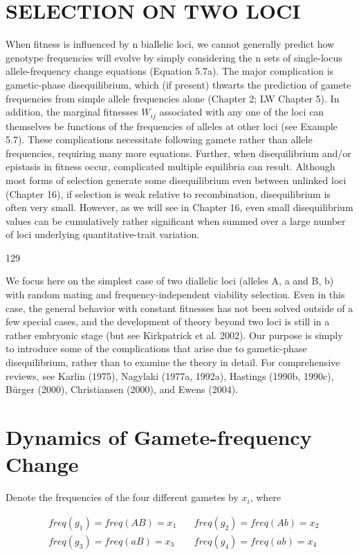 \documentclass{article}
\begin{document}
\section{SELECTION ON TWO LOCI}
When fitness is influenced by n biallelic loci, we cannot generally predict how genotype frequencies will evolve by simply considering the n sets of single-locus allele-frequency change equations (Equation 5.7a). The major complication is gametic-phase disequilibrium, which (if present) thwarts the prediction of gamete frequencies from simple allele frequencies alone (Chapter 2; LW Chapter 5). In addition, the marginal fitnesses  $ W_{ij} $ associated with any one of the loci can themselves be functions of the frequencies of alleles at other loci (see Example 5.7). These complications necessitate following gamete rather than allele frequencies, requiring many more equations. Further, when disequilibrium and/or epistasis in fitness occur, complicated multiple equilibria can result. Although most forms of selection generate some disequilibrium even between unlinked loci (Chapter 16), if selection is weak relative to recombination, disequilibrium is often very small. However, as we will see in Chapter 16, even small disequilibrium values can be cumulatively rather significant when summed over a large number of loci underlying quantitative-trait variation.

129

We focus here on the simplest case of two diallelic loci (alleles A, a and B, b) with random mating and frequency-independent viability selection. Even in this case, the general behavior with constant fitnesses has not been solved outside of a few special cases, and the development of theory beyond two loci is still in a rather embryonic stage (but see Kirkpatrick et al. 2002). Our purpose is simply to introduce some of the complications that arise due to gametic-phase disequilibrium, rather than to examine the theory in detail. For comprehensive reviews, see Karlin (1975), Nagylaki (1977a, 1992a), Hastings (1990b, 1990c), Bürger (2000), Christiansen (2000), and Ewens (2004).

\section{Dynamics of Gamete-frequency Change}
Denote the frequencies of the four different gametes by  $ x_{i} $, where

\begin{equation}
\begin{aligned}&freq(g_{1})=freq(AB)=x_{1}\quad&freq(g_{2})=freq(Ab)=x_{2}\\&freq(g_{3})=freq(aB)=x_{3}\quad&freq(g_{4})=freq(ab)=x_{4}\end{aligned}
\end{equation}
\end{document}
